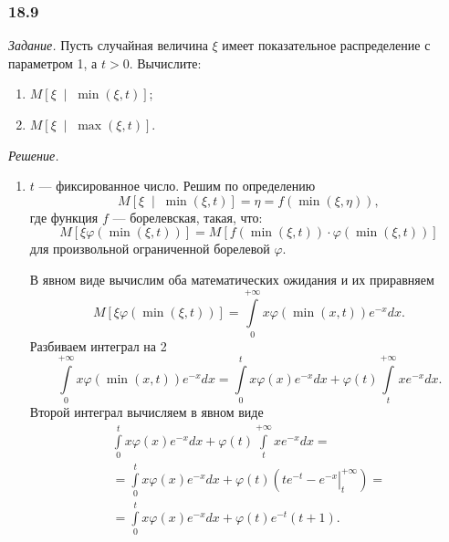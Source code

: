 \subsubsection*{18.9}

\textit{Задание.}
Пусть случайная величина $ \xi $ имеет показательное распределение с параметром 1, а $t > 0$.
Вычислите:
\begin{enumerate}[label=\alph*)]
  \item $M \left[ \xi \; \middle| \; \min \left( \xi, t \right) \right] $;
  \item $M \left[ \xi \; \middle| \; \max \left( \xi, t \right) \right] $.
\end{enumerate}

\textit{Решение.}
\begin{enumerate}[label=\alph*)]
  \item $t$ --- фиксированное число.
  Решим по определению
  $$M \left[ \xi \; \middle| \; \min \left( \xi, t \right) \right] =
    \eta =
    f \left( \min \left( \xi, \eta \right) \right),$$
  где функция $f$ --- борелевская, такая, что:
  $$M \left[ \xi \varphi \left( \min \left( \xi, t \right) \right) \right] =
    M \left[ f \left( \min \left( \xi, t \right) \right) \cdot
    \varphi \left( \min \left( \xi, t \right) \right) \right] $$
  для произвольной ограниченной борелевой $ \varphi $.

  В явном виде вычислим оба математических ожидания и их приравняем
  $$M \left[ \xi \varphi \left( \min \left( \xi, t \right) \right) \right] =
    \int \limits_0^{+ \infty } x \varphi \left( \min \left( x, t \right) \right) e^{-x} dx.$$
  Разбиваем интеграл на 2
  $$ \int \limits_0^{+ \infty } x \varphi \left( \min \left( x, t \right) \right) e^{-x} dx =
    \int \limits_0^t x \varphi \left( x \right) e^{-x} dx +
    \varphi \left( t \right) \int \limits_t^{+ \infty } xe^{-x} dx.$$
  Второй интеграл вычисляем в явном виде
  \begin{equation*}
    \begin{split}
      \int \limits_0^t x \varphi \left( x \right) e^{-x} dx +
      \varphi \left( t \right) \int \limits_t^{+ \infty } xe^{-x} dx = \\
      = \int \limits_0^t x \varphi \left( x \right) e^{-x} dx +
      \varphi \left( t \right) \left( \left. te^{-t} - e^{-x} \right|_t^{+ \infty } \right) = \\
      = \int \limits_0^t x \varphi \left( x \right) e^{-x} dx +
      \varphi \left( t \right) e^{-t} \left( t + 1 \right).
    \end{split}
  \end{equation*}


\end{enumerate}

